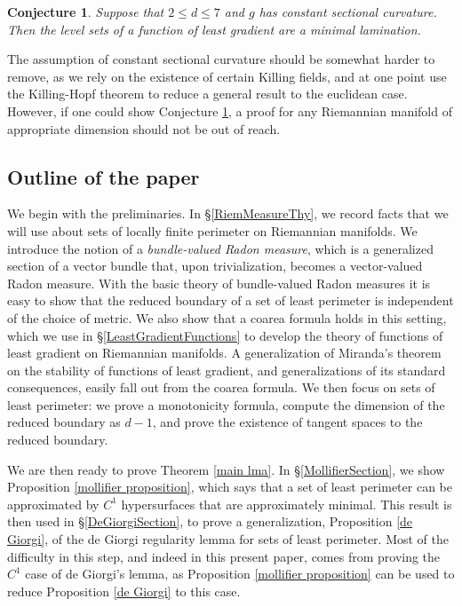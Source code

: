 \documentclass[reqno,12pt,letterpaper]{amsart}
\newcommand{\dfn}[1]{\emph{#1}\index{#1}}
\newtheorem{conjecture}[theorem]{Conjecture}
\theoremstyle{definition}
\numberwithin{equation}{section}
\begin{document}
\begin{conjecture}\label{main conj}
Suppose that $2 \leq d \leq 7$ and $g$ has constant sectional curvature.
Then the level sets of a function of least gradient are a minimal lamination.
\end{conjecture}

The assumption of constant sectional curvature should be somewhat harder to remove, as we rely on the existence of certain Killing fields, and at one point use the Killing-Hopf theorem to reduce a general result to the euclidean case.
However, if one could show Conjecture \ref{main conj}, a proof for any Riemannian manifold of appropriate dimension should not be out of reach.


\subsection{Outline of the paper}
We begin with the preliminaries.
In \S\ref{RiemMeasureThy}, we record facts that we will use about sets of locally finite perimeter on Riemannian manifolds.
We introduce the notion of a \dfn{bundle-valued Radon measure}, which is a generalized section of a vector bundle that, upon trivialization, becomes a vector-valued Radon measure.
With the basic theory of bundle-valued Radon measures it is easy to show that the reduced boundary of a set of least perimeter is independent of the choice of metric.
We also show that a coarea formula holds in this setting, which we use in \S\ref{LeastGradientFunctions} to develop the theory of functions of least gradient on Riemannian manifolds. A generalization of Miranda's theorem \cite[Teorema 3]{Miranda67} on the stability of functions of least gradient, and generalizations of its standard consequences, easily fall out from the coarea formula.
We then focus on sets of least perimeter: we prove a monotonicity formula, compute the dimension of the reduced boundary as $d - 1$, and prove the existence of tangent spaces to the reduced boundary.

We are then ready to prove Theorem \ref{main lma}.
In \S\ref{MollifierSection}, we show Proposition \ref{mollifier proposition}, which says that a set of least perimeter can be approximated by $C^1$ hypersurfaces that are approximately minimal.
This result is then used in \S\ref{DeGiorgiSection}, to prove a generalization, Proposition \ref{de Giorgi}, of the de Giorgi regularity lemma \cite[Teorema 5.7]{Miranda66} for sets of least perimeter.
Most of the difficulty in this step, and indeed in this present paper, comes from proving the $C^1$ case of de Giorgi's lemma, as Proposition \ref{mollifier proposition} can be used to reduce Proposition \ref{de Giorgi} to this case.
\end{document}
